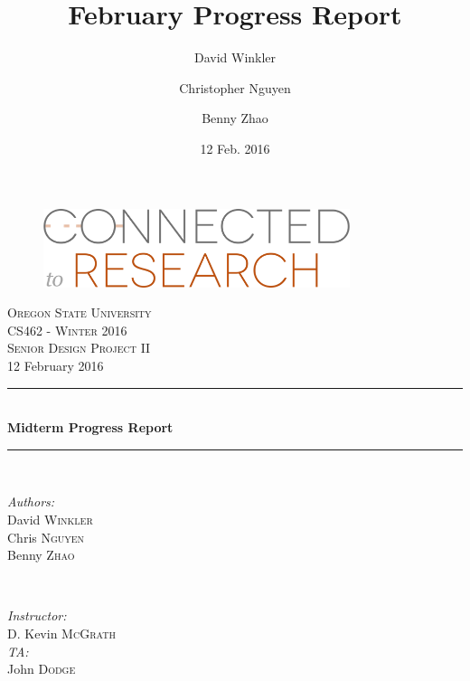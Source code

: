 \documentclass[onecolumn]{IEEEtran}
\title{February Progress Report}
\author{David Winkler \and Christopher Nguyen \and Benny Zhao}
\date{12 Feb. 2016}
\begin{document}
\begin{titlepage}
	\newcommand{\HRule}{\rule{\linewidth}{0.5mm}} %
	\center %
    
    \begin{figure}
        \centering
        \includegraphics[width=0.8\textwidth]{ctr_logo.png}
    \end{figure}
 
	\textsc{\LARGE Oregon State University}\\[1.5cm] %
	\textsc{\Large CS462 - Winter 2016}\\[0.5cm] %
	\textsc{\large Senior Design Project II}\\[0.5cm] %

	{\large 12 February 2016}\\[1cm]
    
	\HRule \\[0.4cm]
		{ \huge \bfseries Midterm Progress Report}\\[0.4cm] %
	\HRule \\[1.5cm]

	\begin{minipage}{0.4\textwidth}
		\begin{flushleft} \large
			\emph{Authors:}\\
			David \textsc{Winkler}\\ %
			Chris \textsc{Nguyen}\\
			Benny \textsc{Zhao}
		\end{flushleft}
	\end{minipage}
	~
	\begin{minipage}{0.4\textwidth}
		\begin{flushright} \large
			\emph{Instructor:} \\
			D. Kevin \textsc{McGrath} \\
            \emph{TA:} \\
            John \textsc{Dodge}
		\end{flushright}
	\end{minipage}\\[2cm]
    

\end{titlepage}
\end{document}
